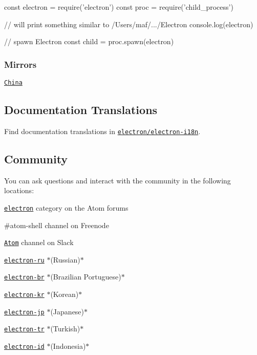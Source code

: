 \begin{DoxyCode}
const electron = require('electron')
const proc = require('child\_process')

// will print something similar to /Users/maf/.../Electron
console.log(electron)

// spawn Electron
const child = proc.spawn(electron)
\end{DoxyCode}


\subsubsection*{Mirrors}


\begin{DoxyItemize}
\item \href{https://npm.taobao.org/mirrors/electron}{\tt China}
\end{DoxyItemize}

\subsection*{Documentation Translations}

Find documentation translations in \href{https://github.com/electron/electron-i18n}{\tt electron/electron-\/i18n}.

\subsection*{Community}

You can ask questions and interact with the community in the following locations\+:
\begin{DoxyItemize}
\item \href{https://discuss.atom.io/c/electron}{\tt {\ttfamily electron}} category on the Atom forums
\item {\ttfamily \#atom-\/shell} channel on Freenode
\item \href{https://atom-slack.herokuapp.com}{\tt {\ttfamily Atom}} channel on Slack
\item \href{https://telegram.me/electron_ru}{\tt {\ttfamily electron-\/ru}} $\ast$(Russian)$\ast$
\item \href{https://electron-br.slack.com}{\tt {\ttfamily electron-\/br}} $\ast$(Brazilian Portuguese)$\ast$
\item \href{https://electron-kr.github.io/electron-kr}{\tt {\ttfamily electron-\/kr}} $\ast$(Korean)$\ast$
\item \href{https://electron-jp.slack.com}{\tt {\ttfamily electron-\/jp}} $\ast$(Japanese)$\ast$
\item \href{https://electron-tr.herokuapp.com}{\tt {\ttfamily electron-\/tr}} $\ast$(Turkish)$\ast$
\item \href{https://electron-id.slack.com}{\tt {\ttfamily electron-\/id}} $\ast$(Indonesia)$\ast$
\end{DoxyItemize}


